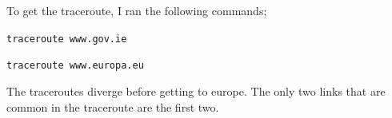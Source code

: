 \documentclass{article}
\begin{document}
\begin{enumerate}
\begin{enumerate}
To get the traceroute, I ran the following commands;

\texttt{traceroute www.gov.ie}

\texttt{traceroute www.europa.eu}

The traceroutes diverge before getting to europe. The only two links that are common in the traceroute are the first two.
\end{enumerate}
\end{enumerate}
\end{document}
